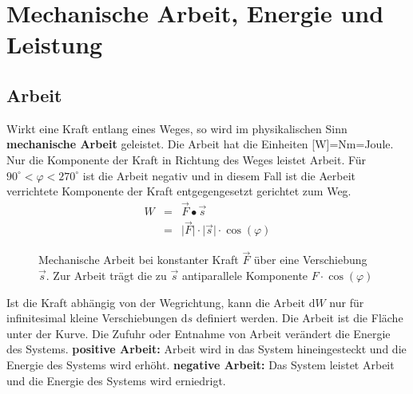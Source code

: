 \section{Mechanische Arbeit, Energie und Leistung}
\subsection{Arbeit}
Wirkt eine Kraft entlang eines Weges, so wird im physikalischen Sinn \textbf{mechanische Arbeit} geleistet. Die Arbeit hat die Einheiten [W]=Nm=Joule. Nur die Komponente der Kraft in Richtung des Weges leistet Arbeit. Für $90^{\circ}<\varphi<270^{\circ}$ ist die Arbeit negativ und in diesem Fall ist die Aerbeit verrichtete Komponente der Kraft entgegengesetzt gerichtet zum Weg. 
\begin{equation}
\boxed{
\begin{array}{lll}
W&=&\overrightarrow{F}\bullet \overrightarrow{s}\\
&=&\Big\vert \overrightarrow{F}\Big\vert\cdot \Big\vert \overrightarrow{s}\Big\vert\cdot \cos\left(\varphi\right)
\end{array}
}
\end{equation}
\begin{figure}[H]
\centering
\caption{Mechanische Arbeit bei konstanter Kraft $\vec{F}$ über eine Verschiebung $\vec{s}$. Zur Arbeit trägt die zu $\vec{s}$ antiparallele Komponente $F\cdot \cos\left(\varphi\right)$}
\label{fig_Ia}
\end{figure}
\noindent Ist die Kraft abhängig von der Wegrichtung, kann die Arbeit $\text{d}W$ nur für infinitesimal kleine Verschiebungen $\text{d}s$ definiert werden. Die Arbeit ist die Fläche unter der Kurve. Die Zufuhr oder Entnahme von Arbeit verändert die Energie des Systems. \textbf{positive Arbeit:} Arbeit wird in das System hineingesteckt und die Energie des Systems wird erhöht. \textbf{negative Arbeit:} Das System leistet Arbeit und die Energie des Systems wird erniedrigt.
